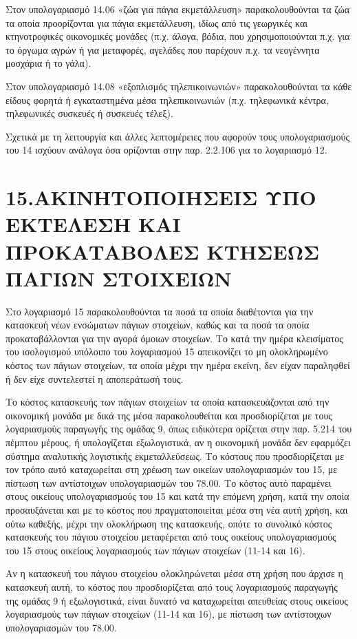 \documentclass[A4,10pt,greek]{book}
\begin{document}
Στον υπολογαριασμό 14.06 «ζώα για πάγια εκμετάλλευση» παρακολουθούνται τα ζώα τα οποία προορίζονται για πάγια εκμετάλλευση, ιδίως από τις γεωργικές και κτηνοτροφικές οικονομικές μονάδες (π.χ. άλογα, βόδια, που χρησιμοποιούνται π.χ.  για το όργωμα αγρών ή για μεταφορές, αγελάδες που παρέχουν π.χ. τα νεογέννητα μοσχάρια ή το γάλα).

Στον υπολογαριασμό 14.08 «εξοπλισμός τηλεπικοινωνιών» παρακολουθούνται τα κάθε είδους φορητά ή εγκαταστημένα μέσα τηλεπικοινωνιών (π.χ. τηλεφωνικά κέντρα, τηλεφωνικές συσκευές ή συσκευές τέλεξ).

Σχετικά με τη λειτουργία και άλλες λεπτομέρειες που αφορούν τους υπολογαριασμούς του 14 ισχύουν ανάλογα όσα ορίζονται στην παρ. 2.2.106 για το λογαριασμό 12.

\section{15.ΑΚΙΝΗΤΟΠΟΙΗΣΕΙΣ ΥΠΟ ΕΚΤΕΛΕΣΗ ΚΑΙ ΠΡΟΚΑΤΑΒΟΛΕΣ ΚΤΗΣΕΩΣ ΠΑΓΙΩΝ ΣΤΟΙΧΕΙΩΝ}

Στο λογαριασμό 15 παρακολουθούνται τα ποσά τα οποία διαθέτονται για την κατασκευή νέων ενσώματων πάγιων στοιχείων, καθώς και τα ποσά τα οποία προκαταβάλλονται για την αγορά όμοιων στοιχείων. Το κατά την ημέρα κλεισίματος του ισολογισμού υπόλοιπο του λογαριασμού 15 απεικονίζει το μη ολοκληρωμένο κόστος των πάγιων στοιχείων, τα οποία μέχρι την ημέρα εκείνη, δεν είχαν παραληφθεί ή δεν είχε συντελεστεί η αποπεράτωσή τους.

Το κόστος κατασκευής των πάγιων στοιχείων τα οποία κατασκευάζονται από την οικονομική μονάδα με δικά της μέσα παρακολουθείται και προσδιορίζεται με τους λογαριασμούς παραγωγής της ομάδας 9, όπως ειδικότερα ορίζεται στην παρ. 5.214 του πέμπτου μέρους, ή υπολογίζεται εξωλογιστικά, αν η οικονομική μονάδα δεν εφαρμόζει σύστημα αναλυτικής λογιστικής εκμεταλλεύσεως. Το κόστους που προσδιορίζεται με τον τρόπο αυτό καταχωρείται στη χρέωση των οικείων υπολογαριασμών του 15, με πίστωση των αντίστοιχων υπολογαριασμών του 78.00. Το κόστος αυτό παραμένει στους οικείους υπολογαριασμούς του 15 και κατά την επόμενη χρήση, κατά την οποία προσαυξάνεται και με το κόστος που πραγματοποιείται μέσα στη νέα αυτή χρήση, και ούτω καθεξής, μέχρι την ολοκλήρωση της κατασκευής, οπότε το συνολικό κόστος κατασκευής του πάγιου στοιχείου μεταφέρεται από τους οικείους υπολογαριασμούς του 15 στους οικείους λογαριασμούς των πάγιων στοιχείων (11-14 και 16).

Αν η κατασκευή του πάγιου στοιχείου ολοκληρώνεται μέσα στη χρήση που άρχισε η κατασκευή αυτή, το κόστος που προσδιορίζεται από τους λογαριασμούς παραγωγής της ομάδας 9 ή εξωλογιστικά, είναι δυνατό να καταχωρείται απευθείας στους οικείους λογαριασμούς των πάγιων στοιχείων (11-14 και 16), με πίστωση των αντίστοιχων υπολογαριασμών του 78.00.
\end{document}

